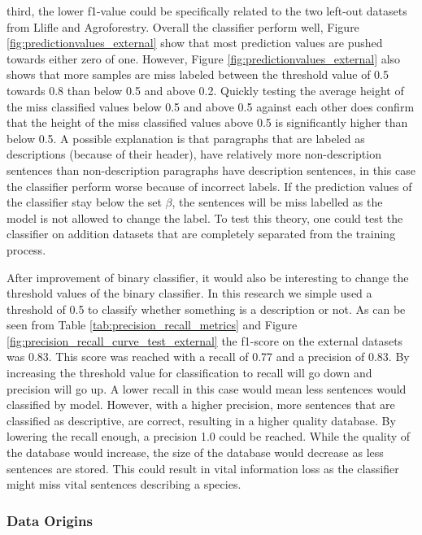 \documentclass[a4paper, 12pt, oneside]{book} %
\begin{document}
third, the lower f1-value could be specifically related to the two left-out datasets from Llifle and Agroforestry.
Overall the classifier perform well, Figure \ref{fig:predictionvalues_external} show that most prediction values are pushed towards either zero of one.
However, Figure \ref{fig:predictionvalues_external} also shows that more samples are miss labeled between the threshold value of 0.5 towards 0.8 than below 0.5 and above 0.2.
Quickly testing the average height of the miss classified values below 0.5 and above 0.5 against each other does confirm that the height of the miss classified values above 0.5 is significantly higher than below 0.5.
A possible explanation is that paragraphs that are labeled as descriptions (because of their header), have relatively more non-description sentences than non-description paragraphs have description sentences, in this case the classifier perform worse because of incorrect labels.
If the prediction values of the classifier stay below the set \(\beta\), the sentences will be miss labelled as the model is not allowed to change the label.
To test this theory, one could test the classifier on addition datasets that are completely separated from the training process.

After improvement of binary classifier, it would also be interesting to change the threshold values of the binary classifier.
In this research we simple used a threshold of 0.5 to classify whether something is a description or not.
As can be seen from Table \ref{tab:precision_recall_metrics} and Figure \ref{fig:precision_recall_curve_test_external} the f1-score on the external datasets was 0.83. 
This score was reached with a recall of 0.77 and a precision of 0.83.
By increasing the threshold value for classification to recall will go down and precision will go up.
A lower recall in this case would mean less sentences would classified by model.
However, with a higher precision, more sentences that are classified as descriptive, are correct, resulting in a higher quality database.
By lowering the recall enough, a precision 1.0 could be reached.
While the quality of the database would increase, the size of the database would decrease as less sentences are stored.
This could result in vital information loss as the classifier might miss vital sentences describing a species.

\subsubsection{Data Origins}
\end{document}
